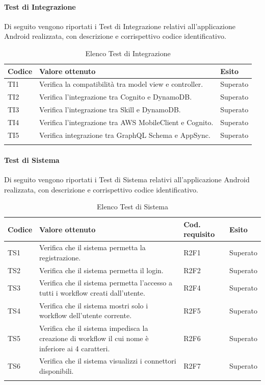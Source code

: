 \paragraph{Test di Integrazione}
\label{sec:tiRA}
Di seguito vengono riportati i Test di Integrazione relativi all'applicazione Android realizzata, con descrizione e corrispettivo codice identificativo.
\begin{center}
	\centering
	\renewcommand{\arraystretch}{1.5}
	\begin{longtable}{  p{1.5cm}  p{10.5cm} p{2cm}  }
		\rowcolor{tableHeadYellow}
		\textbf{Codice}   & \textbf{Valore ottenuto} & \textbf{Esito} \\ 
		\endhead
		TI1 & Verifica la compatibilità tra model view e controller.  & Superato \\
		TI2 & Verifica l’integrazione tra Cognito e DynamoDB. & Superato \\
		TI3 & Verifica l’integrazione tra Skill e DynamoDB. & Superato \\
		TI4 & Verifica l’integrazione tra AWS MobileClient e Cognito. & Superato \\
		TI5 & Verifica integrazione tra GraphQL Schema e AppSync. & Superato \\
		\rowcolor{white}
		\caption{Elenco Test di Integrazione}
	\end{longtable}
\end{center}
\paragraph{Test di Sistema}
\label{sec:tsRA}
Di seguito vengono riportati i Test di Sistema relativi all'applicazione Android realizzata, con descrizione e corrispettivo codice identificativo.
\begin{center}
	\centering
	\renewcommand{\arraystretch}{1.5}
	\begin{longtable}{  p{1.2cm}  p{8.5cm} p{2cm} p{1.5cm} }
		\rowcolor{tableHeadYellow}
		\textbf{Codice}   & \textbf{Valore ottenuto} & \textbf{Cod. \mbox{requisito}} & \textbf{Esito} \\ 
		\endhead
		TS1 & Verifica che il sistema permetta la registrazione. & R2F1 & Superato \\
		TS2 & Verifica che il sistema permetta il login. & R2F2 & Superato \\
		TS3 & Verifica che il sistema permetta l’accesso a tutti i workflow creati dall’utente. & R2F4 & Superato \\
		TS4 & Verifica che il sistema mostri solo i workflow dell’utente corrente. & R2F5 & Superato \\
		TS5 & Verifica che il sistema impedisca la creazione di workflow il cui nome è inferiore ai 4 caratteri. & R2F6 & Superato \\
		TS6 & Verifica che il sistema visualizzi i connettori disponibili. & R2F7 & Superato \\
		\rowcolor{white}
		\caption{Elenco Test di Sistema}
	\end{longtable}
\end{center}
\pagebreak
